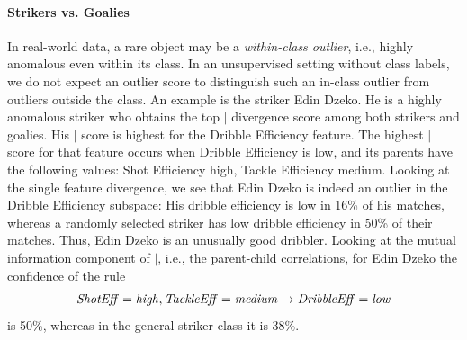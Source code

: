 {							\paragraph{Strikers vs. Goalies} 
							In real-world data, a rare object may be a {\em within-class outlier}, i.e., highly anomalous even within its class. In an unsupervised setting without class labels, we do not expect an outlier score to distinguish such an in-class outlier from outliers outside the class. 
							An example is the striker Edin Dzeko. He is a highly anomalous striker who obtains the top $\mid$ divergence score among both strikers and goalies. His $\mid$ score is highest for the Dribble Efficiency feature. The highest $\mid$ score for that feature occurs when Dribble Efficiency is low, and its parents have the following values: Shot Efficiency high, Tackle Efficiency medium. Looking at the single feature divergence, 
							we see that Edin Dzeko is indeed an outlier in the Dribble Efficiency subspace: His dribble efficiency is low in 16\% of his matches, whereas a randomly selected striker has low dribble efficiency in 50\% of their matches. Thus, Edin Dzeko is an unusually good dribbler.  Looking at the mutual information component of $\mid$, i.e., the parent-child correlations, for Edin Dzeko the confidence of the rule 
							$$\it{ShotEff} = \it{high}, \it{TackleEff} = \it{medium}\rightarrow \it{DribbleEff} = \it{low}$$ is 50\%, whereas in the general striker class it is $38\%$.
							
}
